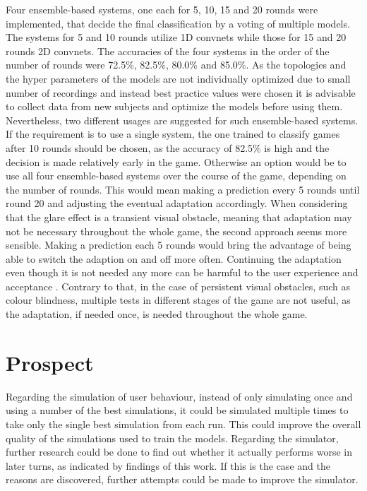 Four ensemble-based systems, one each for 5, 10, 15 and 20 rounds were implemented, that decide the final classification by a voting of multiple models. The systems for 5 and 10 rounds utilize 1D convnets while those for 15 and 20 rounds 2D convnets. The accuracies of the four systems in the order of the number of rounds were 72.5\%, 82.5\%, 80.0\% and 85.0\%. As the topologies and the hyper parameters of the models are not individually optimized due to small number of recordings and instead best practice values were chosen it is advisable to collect data from new subjects and optimize the models before using them. Nevertheless, two different usages are suggested for such ensemble-based systems. If the requirement is to use a single system, the one trained to classify games after 10 rounds should be chosen, as the accuracy of 82.5\% is high and the decision is made relatively early in the game. Otherwise an option would be to use all four ensemble-based systems over the course of the game, depending on the number of rounds. This would mean making a prediction every 5 rounds until round 20 and adjusting the eventual adaptation accordingly. When considering that the glare effect is a transient visual obstacle, meaning that adaptation may not be necessary throughout the whole game, the second approach seems more sensible. Making a prediction each 5 rounds would bring the advantage of being able to switch the adaption on and off more often. Continuing the adaptation even though it is not needed any more can be harmful to the user experience and acceptance \cite[p.~1]{blind}. Contrary to that, in the case of persistent visual obstacles, such as colour blindness, multiple tests in different stages of the game are not useful, as the adaptation, if needed once, is needed throughout the whole game.

\section{Prospect}
\label{prospect}
Regarding the simulation of user behaviour, instead of only simulating once and using a number of the best simulations, it could be simulated multiple times to take only the single best simulation from each run. This could improve the overall quality of the simulations used to train the models. Regarding the simulator, further research could be done to find out whether it actually performs worse in later turns, as indicated by findings of this work. If this is the case and the reasons are discovered, further attempts could be made to improve the simulator.

